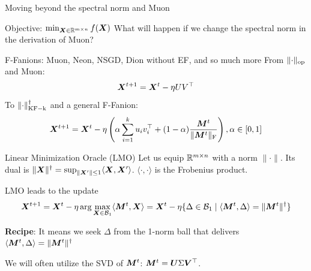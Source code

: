 \documentclass[aspectratio=169]{beamer}
\newcommand{\norm}[1]{\lVert #1\rVert}
\newcommand{\Rmn}{\R^{m\times n}}
\newcommand{\cB}{\mathcal{B}}
\DeclarePairedDelimiter{\normf}{\|}{\|_\mathrm{F}}
\DeclarePairedDelimiter{\normkfk}{\|}{\|_\mathrm{KF-k}}
\DeclarePairedDelimiter{\norms}{\|}{\|_{\mathrm{op}}}
\def\<#1,#2>{\langle #1,#2\rangle}
\begin{document}
\begin{frame}{Moving beyond the spectral norm and Muon}
    \begin{block}{Objective:  $\min_{{\bm{X}}\in\mathbb{R}^{m\times n}} f({\bm{X}})$}
    \faQuestionCircle \space What will happen if we change the spectral norm in the derivation of Muon?
    \end{block}
    \begin{block}{F-Fanions: Muon, Neon, NSGD, Dion without EF, and so much more}
        From $\norms{\cdot}$ and Muon:
        $${\bm{X}}^{t+1} = {\bm{X}}^{t} - \eta U V^\top$$
        To $\normkfk{\cdot}^\dagger$ and a general F-Fanion:
        $$\mX^{t+1} = \mX^{t} - \eta \left(\alpha \sum_{i=1}^k{u_i v_i^\top} + (1-\alpha)\frac{\mM^t}{\normf{\mM^t}}\right), \alpha \in [0,1]$$
    \end{block}
      
\end{frame}
\begin{frame}{Linear Minimization Oracle (LMO)}
Let us equip $\Rmn$ with a norm $\norm{\cdot}$. Its dual is $\norm{\mX}^\dagger = \sup_{\norm{\mX'}\leq 1} \<\mX,\mX'>$. $\<\cdot, \cdot>$ is the Frobenius product.
\vspace{0.4em}

LMO leads to the update
$$\mX^{t+1} = \mX^{t} - \eta \arg\max_{\mX \in \cB_1} \<\mM^t, \mX> = \mX^{t} - \eta \{\Delta \in \cB_1 \mid \<\mM^t, \Delta> = \norm{\mM^t}^\dagger\}$$

\vspace{0.4em}

\textbf{Recipe}: It means we seek $\Delta$ from the 1-norm ball that delivers $\<\mM^t, \Delta> = \norm{\mM^t}^\dagger$
\vspace{0.4em}

We will often utilize the SVD of ${\bm{M}}^t$: ${\bm{M}}^t = {\bm{U}} \Sigma {\bm{V}}^\top$.
\end{frame}
\end{document}
